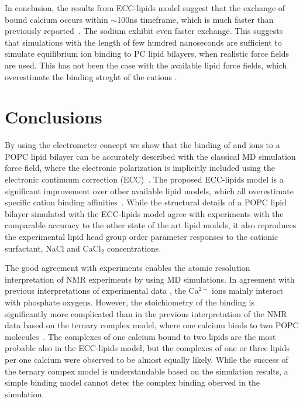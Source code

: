\documentclass[aip,jcp,twocolumn]{revtex4}
\begin{document}
In conclusion, the results from ECC-lipids model suggest that the
exchange of bound calcium occurs within $\sim$100ns timeframe,
which is much faster than previously reported~\cite{javanainen17}.
The sodium exhibit even faster exchange.
This suggests that simulations with the length of few hundred
nanoseconds are sufficient to simulate equilibrium ion binding
to PC lipid bilayers, when realistic force fields are used.
This has not been the case with the available lipid force fields,
which overestimate the binding streght of the cations \cite{javanainen17,catte16}.








\section{Conclusions}

By using the electrometer concept we show that the binding of  and  ions
to a POPC lipid bilayer can be accurately described with the classical MD simulation 
force field, where the electronic polarization is implicitly included using 
the electronic continuum correction (ECC)~\cite{leontyev11}.
The proposed ECC-lipids model is a significant improvement over 
other available lipid models, which all overestimate specific cation binding affinities~\cite{catte16}.  
While the structural details of a POPC lipid bilayer simulated with the ECC-lipids
model agree with experiments with the comparable accuracy to the other state of the art lipid models,
it also reproduces the experimental lipid head group order parameter responses to
the cationic surfactant, NaCl and CaCl$_2$ concentrations. 

The good agreement with experiments enables the atomic resolution 
interpretation of NMR experiments by using MD simulations.
In agreement with previous interpretations of experimental data \cite{hauser76,hauser78,herbette84,binder02},
the Ca$^{2+}$ ions mainly interact with phosphate oxygens.
However, the stoichiometry of the binding is significantly more complicated 
than in the previous interpretation of the NMR data based on 
the ternary complex model, where one calcium binds to two POPC molecules~\cite{altenbach84}.
The complexes of one calcium bound to two lipids are the most probable also in the
ECC-lipids model, but the complexes of one or three lipids per one calcium
were observed to be almost equally likely. While the success of the ternary
compex model is understandable based on the simulation results,
a simple binding model cannot detec the complex binding
oberved in the simulation.
\end{document}
